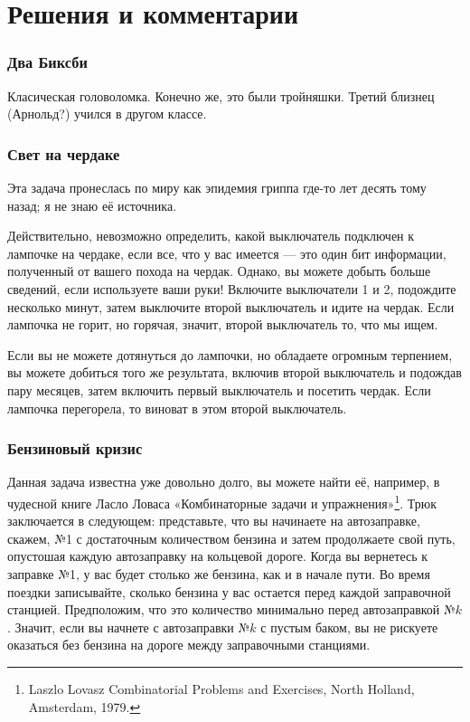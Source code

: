 \section*{Решения и комментарии}


\subsubsection*{Два Биксби} %



Класическая головоломка. Конечно же, это  были тройняшки. Третий близнец (Арнольд?) учился в другом классе.




\subsubsection*{Свет на чердаке}  %



Эта задача пронеслась по миру как эпидемия гриппа где-то лет десять тому назад; я не знаю её источника.


Действительно, невозможно определить, какой выключатель подключен к лампочке на чердаке, если все, что у вас имеется --- это один бит информации, полученный от вашего похода на чердак. Однако, вы можете добыть больше сведений, если используете ваши руки!  Включите выключатели 1 и 2, подождите несколько минут, затем выключите второй выключатель и идите на чердак. Если лампочка не горит, но горячая, значит, второй выключатель то, что мы ищем.\heart


Если вы не можете дотянуться до лампочки, но обладаете огромным терпением, вы можете добиться того же результата, включив второй выключатель и подождав пару месяцев, затем включить первый выключатель и посетить чердак. Если лампочка перегорела, то виноват в этом второй выключатель.


\subsubsection*{Бензиновый кризис} %

Данная задача известна уже довольно долго, вы можете найти её, например, в чудесной книге   Ласло Ловаса  «Комбинаторные задачи и упражнения»\footnote{Laszlo Lovasz Combinatorial Problems and Exercises, North Holland, Amsterdam, 1979.}. Трюк заключается в следующем:
представьте, что вы начинаете на автозаправке, скажем, №1 с достаточным количеством бензина и затем продолжаете свой путь, опустошая каждую автозаправку на кольцевой дороге. 
Когда вы вернетесь к заправке №1, 
у вас будет столько же бензина, как и в начале пути.
Во время поездки записывайте, сколько бензина у вас остается перед каждой заправочной станцией. 
Предположим, что это количество минимально перед автозаправкой №$k$. 
Значит, если вы начнете с автозаправки №$k$ с пустым баком, вы не рискуете оказаться без бензина на дороге между заправочными станциями.\heart

